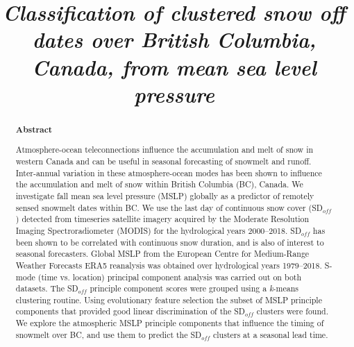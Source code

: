\documentclass{tATO2e}
\newcommand{\sdoff}{SD$_{off}$}
\begin{document}

\articletype{}%

\title{\textit{Classification of clustered snow off dates over British Columbia, Canada, from mean sea level pressure}}

\author{
}

\maketitle

\newpage 

\begin{abstract}
	
\textbf{Abstract}

Atmosphere-ocean teleconnections influence the accumulation and melt of snow in western Canada and can be useful in seasonal forecasting of snowmelt and runoff. Inter-annual variation in these atmosphere-ocean modes has been shown to influence the accumulation and melt of snow within British Columbia (BC), Canada. We investigate fall mean sea level pressure (MSLP) globally as a predictor of remotely sensed snowmelt dates within BC. We use the last day of continuous snow cover (\sdoff{}) detected from timeseries satellite imagery acquired by the Moderate Resolution Imaging Spectroradiometer (MODIS) for the hydrological years 2000--2018. \sdoff{} has been shown to be correlated with continuous snow duration, and is also of interest to seasonal forecasters. Global MSLP from the European Centre for Medium-Range Weather Forecasts ERA5 reanalysis was obtained over hydrological years 1979--2018. S-mode (time vs. location) principal component analysis was carried out on both datasets. The \sdoff{} principle component scores were grouped using a \textit{k}-means clustering routine. Using evolutionary feature selection the subset of MSLP principle components that provided good linear discrimination of the \sdoff{} clusters were found. We explore the atmospheric MSLP principle components that influence the timing of snowmelt over BC, and use them to predict the \sdoff{} clusters at a seasonal lead time. 
\end{abstract}
\end{document}
